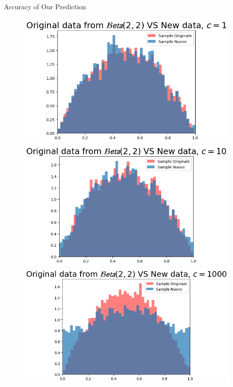 \documentclass{beamer}
\begin{document}
\begin{frame}{Accuracy of Our Prediction}
\bigskip
    \begin{figure}
        \begin{minipage}{0.32\textwidth}
            \centering
            \includegraphics[width=\textwidth]{PredBetac1.png}
        \end{minipage}
        \hfill
        \begin{minipage}{0.32\textwidth}
            \centering
            \includegraphics[width=\textwidth]{PredBetac10.png}
        \end{minipage}
        \hfill
        \begin{minipage}{0.32\textwidth}
            \centering
            \includegraphics[width=\textwidth]{PredBetac1000.png}
        \end{minipage}
    \end{figure}
    \caption{Predictive density estimated for a \(Beta(2,2)\)}

\end{frame}
\end{document}
